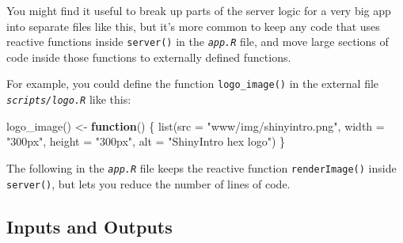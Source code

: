 \documentclass[
  oneside]{book}
\newenvironment{Shaded}{\begin{snugshade}}{\end{snugshade}}
\newcommand{\AttributeTok}[1]{\textcolor[rgb]{0.77,0.63,0.00}{#1}}
\newcommand{\ConstantTok}[1]{\textcolor[rgb]{0.00,0.00,0.00}{#1}}
\newcommand{\ControlFlowTok}[1]{\textcolor[rgb]{0.13,0.29,0.53}{\textbf{#1}}}
\newcommand{\FunctionTok}[1]{\textcolor[rgb]{0.00,0.00,0.00}{#1}}
\newcommand{\NormalTok}[1]{#1}
\newcommand{\OtherTok}[1]{\textcolor[rgb]{0.56,0.35,0.01}{#1}}
\newcommand{\SpecialCharTok}[1]{\textcolor[rgb]{0.00,0.00,0.00}{#1}}
\newcommand{\StringTok}[1]{\textcolor[rgb]{0.31,0.60,0.02}{#1}}
\begin{document}
You might find it useful to break up parts of the server logic for a very big app into separate files like this, but it's more common to keep any code that uses reactive functions inside \texttt{server}\texttt{()} in the \textit{\texttt{app.R}} file, and move large sections of code inside those functions to externally defined functions.

For example, you could define the function \texttt{logo\_image}\texttt{()} in the external file \textit{\texttt{scripts/logo.R}} like this:

\begin{Shaded}
\begin{Highlighting}[]
\FunctionTok{logo\_image}\NormalTok{() }\OtherTok{\textless{}{-}} \ControlFlowTok{function}\NormalTok{() \{}
    \FunctionTok{list}\NormalTok{(}\AttributeTok{src =} \StringTok{"www/img/shinyintro.png"}\NormalTok{, }\AttributeTok{width =} \StringTok{"300px"}\NormalTok{, }\AttributeTok{height =} \StringTok{"300px"}\NormalTok{, }\AttributeTok{alt =} \StringTok{"ShinyIntro hex logo"}\NormalTok{)}
\NormalTok{\}}
\end{Highlighting}
\end{Shaded}

The following in the \textit{\texttt{app.R}} file keeps the reactive function \texttt{renderImage}\texttt{()} inside \texttt{server}\texttt{()}, but lets you reduce the number of lines of code.

\begin{Shaded}
\end{Shaded}

\hypertarget{inputs-and-outputs}{%
\subsection{Inputs and Outputs}\label{inputs-and-outputs}}
\end{document}
